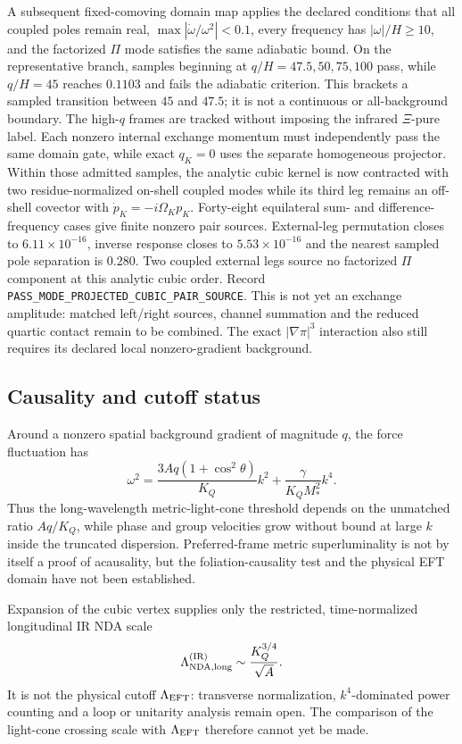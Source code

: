 A subsequent fixed-comoving domain map applies the declared conditions that
all coupled poles remain real, $\max|\dot\omega/\omega^2|<0.1$, every
frequency has $|\omega|/H\geq10$, and the factorized $\Pi$ mode satisfies the
same adiabatic bound.  On the representative branch, samples beginning at
$q/H=47.5,50,75,100$ pass, while $q/H=45$ reaches $0.1103$ and fails the
adiabatic criterion.  This brackets a sampled transition between $45$ and
$47.5$; it is not a continuous or all-background boundary.  The high-$q$
frames are tracked without imposing the infrared $\Xi$-pure label.  Each
nonzero internal exchange momentum must independently pass the same domain
gate, while exact $q_K=0$ uses the separate homogeneous projector.
Within those admitted samples, the analytic cubic kernel is now contracted
with two residue-normalized on-shell coupled modes while its third leg remains
an off-shell covector with $\dot p_K=-i\Omega_Kp_K$.  Forty-eight equilateral
sum- and difference-frequency cases give finite nonzero pair sources.
External-leg permutation closes to $6.11\times10^{-16}$, inverse response
closes to $5.53\times10^{-16}$ and the nearest sampled pole separation is
$0.280$.  Two coupled external legs source no factorized $\Pi$ component at
this analytic cubic order.  Record
\texttt{PASS\_MODE\_PROJECTED\_CUBIC\_PAIR\_SOURCE}.  This is not yet an
exchange amplitude: matched left/right sources, channel summation and the
reduced quartic contact remain to be combined.  The exact
$|\nabla\pi|^3$ interaction also still requires its declared local
nonzero-gradient background.

\subsection{Causality and cutoff status}

Around a nonzero spatial background gradient of magnitude $q$, the force
fluctuation has
\begin{equation}
 \omega^2=\frac{3Aq(1+\cos^2\theta)}{K_Q}k^2
 +\frac{\gamma}{K_QM_*^2}k^4.
 \label{eq:force-dispersion}
\end{equation}
Thus the long-wavelength metric-light-cone threshold depends on the unmatched
ratio $Aq/K_Q$, while phase and group velocities grow without bound at large
$k$ inside the truncated dispersion.  Preferred-frame metric superluminality
is not by itself a proof of acausality, but the foliation-causality test and the
physical EFT domain have not been established.

Expansion of the cubic vertex supplies only the restricted, time-normalized
longitudinal IR NDA scale
\begin{equation}
 \Lambda_{\rm NDA,long}^{\rm (IR)}\sim\frac{K_Q^{3/4}}{\sqrt A}.
 \label{eq:long-nda}
\end{equation}
It is not the physical cutoff $\Lambda_{\rm EFT}$: transverse normalization,
$k^4$-dominated power counting and a loop or unitarity analysis remain open.
The comparison of the light-cone crossing scale with $\Lambda_{\rm EFT}$
therefore cannot yet be made.

